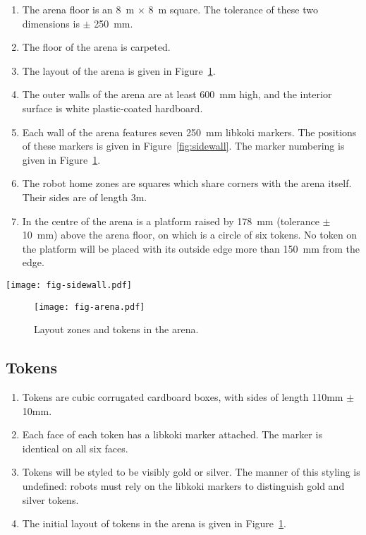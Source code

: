 \begin{enumerate}
  \item The arena floor is an \SI{8}{m} $\times$ \SI{8}{m} square. The tolerance
        of these two dimensions is $\pm$ \SI{250}{mm}.
  \item The floor of the arena is carpeted.
  \item The layout of the arena is given in Figure~\ref{fig:arena}.
  \item The outer walls of the arena are at least \SI{600}{mm} high, and the
        interior surface is white plastic-coated hardboard.
  \item Each wall of the arena features seven \SI{250}{mm} libkoki markers.
        The positions of these markers is given in Figure~\ref{fig:sidewall}.
        The marker numbering is given in Figure~\ref{fig:arena}.
  \item The robot home zones are squares which share corners with the arena
        itself. Their sides are of length \si{3}{m}.
  \item In the centre of the arena is a platform raised by \SI{178}{mm}
        (tolerance $\pm$ \SI{10}{mm}) above the arena floor, on which is a
        circle of six tokens. No token on the platform will be placed with its
        outside edge more than \SI{150}{mm} from the edge.
\end{enumerate}

\begin{sidewaysfigure}
  \texttt{[image: fig-sidewall.pdf]}
  \caption{Layout of markers along each arena wall.}
  \label{fig:sidewall}
\end{sidewaysfigure}

\begin{figure}
  \texttt{[image: fig-arena.pdf]}
  \caption{Layout zones and tokens in the arena.}
  \label{fig:arena}
\end{figure}


\subsection{Tokens}
\label{spec:tokens}

\begin{enumerate}
  \item Tokens are cubic corrugated cardboard boxes, with sides of length
        \si{110}{mm} $\pm$ \si{10}{mm}.
  \item Each face of each token has a libkoki marker attached. The marker is
        identical on all six faces.
  \item Tokens will be styled to be visibly gold or silver. The manner of this
        styling is undefined: robots must rely on the libkoki markers to
        distinguish gold and silver tokens.
  \item The initial layout of tokens in the arena is given in
        Figure~\ref{fig:arena}.
\end{enumerate}

